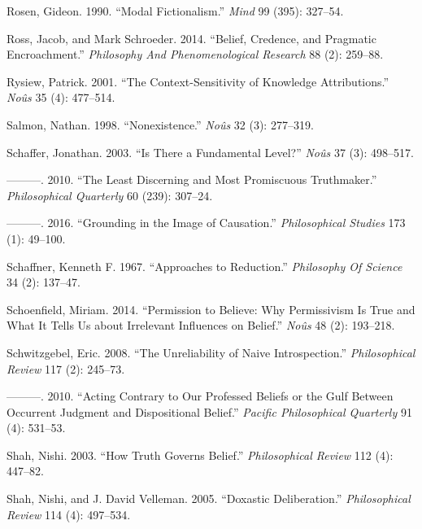 \documentclass[
  10pt,
  letterpaper,
  DIV=11,
  numbers=noendperiod,
  twoside]{scrartcl}
\newlength{\cslhangindent}
\newenvironment{CSLReferences}[2] %
 {\begin{list}{}{%
  \setlength{\itemindent}{0pt}
  \setlength{\leftmargin}{0pt}
  \setlength{\parsep}{0pt}
  \ifodd #1
   \setlength{\leftmargin}{\cslhangindent}
   \setlength{\itemindent}{-1\cslhangindent}
  \fi
  \setlength{\itemsep}{#2\baselineskip}}}
 {\end{list}}
\begin{document}
\begin{CSLReferences}{1}{0}
Rosen, Gideon. 1990. {``Modal Fictionalism.''} \emph{Mind} 99 (395):
327--54.

Ross, Jacob, and Mark Schroeder. 2014. {``Belief, Credence, and
Pragmatic Encroachment.''} \emph{Philosophy And Phenomenological
Research} 88 (2): 259--88.

Rysiew, Patrick. 2001. {``The Context-Sensitivity of Knowledge
Attributions.''} \emph{Noûs} 35 (4): 477--514.

Salmon, Nathan. 1998. {``Nonexistence.''} \emph{Noûs} 32 (3): 277--319.

Schaffer, Jonathan. 2003. {``Is There a Fundamental Level?''}
\emph{Noûs} 37 (3): 498--517.

---------. 2010. {``The Least Discerning and Most Promiscuous
Truthmaker.''} \emph{Philosophical Quarterly} 60 (239): 307--24.

---------. 2016. {``Grounding in the Image of Causation.''}
\emph{Philosophical Studies} 173 (1): 49--100.

Schaffner, Kenneth F. 1967. {``Approaches to Reduction.''}
\emph{Philosophy Of Science} 34 (2): 137--47.

Schoenfield, Miriam. 2014. {``Permission to Believe: Why Permissivism Is
True and What It Tells Us about Irrelevant Influences on Belief.''}
\emph{Noûs} 48 (2): 193--218.

Schwitzgebel, Eric. 2008. {``The Unreliability of Naive
Introspection.''} \emph{Philosophical Review} 117 (2): 245--73.

---------. 2010. {``Acting Contrary to Our Professed Beliefs or the Gulf
Between Occurrent Judgment and Dispositional Belief.''} \emph{Pacific
Philosophical Quarterly} 91 (4): 531--53.

Shah, Nishi. 2003. {``How Truth Governs Belief.''} \emph{Philosophical
Review} 112 (4): 447--82.

Shah, Nishi, and J. David Velleman. 2005. {``Doxastic Deliberation.''}
\emph{Philosophical Review} 114 (4): 497--534.


\end{CSLReferences}
\end{document}
